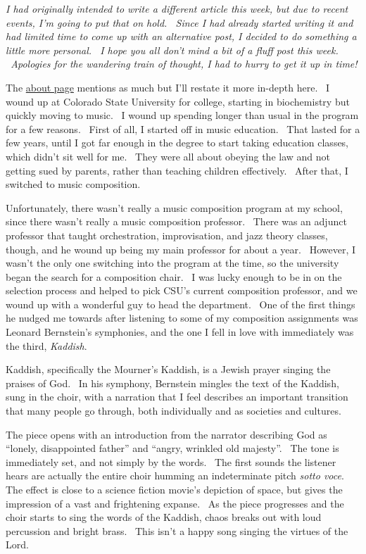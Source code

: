 \emph{I had originally intended to write a different article this week,
but due to recent events, I'm going to put that on hold. ~Since I had
already started writing it and had limited time to come up with an
alternative post, I decided to do something a little more personal. ~I
hope you all don't mind a bit of a fluff post this week. ~Apologies for
the wandering train of thought, I had to hurry to get it up in time!}

The \href{http://adjectivespecies.com/about/}{about page} mentions as
much but I'll restate it more in-depth here. ~I wound up at Colorado
State University for college, starting in biochemistry but quickly
moving to music. ~I wound up spending longer than usual in the program
for a few reasons. ~First of all, I started off in music education.
~That lasted for a few years, until I got far enough in the degree to
start taking education classes, which didn't sit well for me. ~They were
all about obeying the law and not getting sued by parents, rather than
teaching children effectively. ~After that, I switched to music
composition.

Unfortunately, there wasn't really a music composition program at my
school, since there wasn't really a music composition professor. ~There
was an adjunct professor that taught orchestration, improvisation, and
jazz theory classes, though, and he wound up being my main professor for
about a year. ~However, I wasn't the only one switching into the program
at the time, so the university began the search for a composition chair.
~I was lucky enough to be in on the selection process and helped to pick
CSU's current composition professor, and we wound up with a wonderful
guy to head the department. ~One of the first things he nudged me
towards after listening to some of my composition assignments was
Leonard Bernstein's symphonies, and the one I fell in love with
immediately was the third, \emph{Kaddish}.

Kaddish, specifically the Mourner's Kaddish, is a Jewish prayer singing
the praises of God. ~In his symphony, Bernstein mingles the text of the
Kaddish, sung in the choir, with a narration that I feel describes an
important transition that many people go through, both individually and
as societies and cultures.

The piece opens with an introduction from the narrator describing God as
``lonely, disappointed father'' and ``angry, wrinkled old majesty''.
~The tone is immediately set, and not simply by the words. ~The first
sounds the listener hears are actually the entire choir humming an
indeterminate pitch \emph{sotto voce}. The effect is close to a science
fiction movie's depiction of space, but gives the impression of a vast
and frightening expanse. ~As the piece progresses and the choir starts
to sing the words of the Kaddish, chaos breaks out with loud percussion
and bright brass. ~This isn't a happy song singing the virtues of the
Lord.

